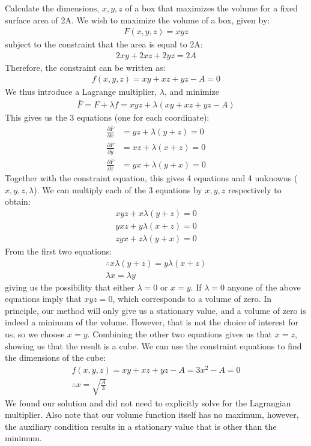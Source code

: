 \begin{example}{0pt}{Calculate the dimensions, $x,y,z$ of a box that maximizes the volume for a fixed surface area of 2A.}{}
We wish to maximize the volume of a box, given by:
\begin{align*}
F(x,y,z)=xyz
\end{align*}
subject to the constraint that the area is equal to 2A:
\begin{align*}
2xy+2xz+2yz=2A
\end{align*}
Therefore, the constraint can be written as:
\begin{align*}
f(x,y,z)=xy+xz+yz-A=0
\end{align*}
We thus introduce a Lagrange multiplier, $\lambda$, and minimize
\begin{align*}
\bar{F}=F+\lambda f= xyz+\lambda(xy+xz+yz-A)
\end{align*}
This gives us the 3 equations (one for each coordinate):
\begin{align*}
\frac{\partial \bar{F}}{\partial x}&=yz+\lambda(y+z)=0\\
\frac{\partial \bar{F}}{\partial y}&=xz+\lambda(x+z)=0\\
\frac{\partial \bar{F}}{\partial z}&=yx+\lambda(y+x)=0
\end{align*}
Together with the constraint equation, this gives 4 equations and 4 unknowns ($x,y,z,\lambda$). We can multiply each of the 3 equations by $x,y,z$ respectively to obtain:
\begin{align*}
xyz+x\lambda(y+z)=0\\
yxz+y\lambda(x+z)=0\\
zyx+z\lambda(y+x)=0
\end{align*}
From the first two equations:
\begin{align*}
\therefore x\lambda(y+z)=y\lambda(x+z)\\
\lambda x= \lambda y
\end{align*}
giving us the possibility that either $\lambda=0$ or $x=y$. If $\lambda=0$ anyone of the above equations imply that $xyz=0$, which corresponds to a volume of zero. In principle, our method will only give us a stationary value, and a volume of zero is indeed a minimum of the volume. However, that is not the choice of interest for us, so we choose $x=y$. Combining the other two equations gives us that $x=z$, showing us that the result is a cube. We can use the constraint equations to find the dimensions of the cube:
\begin{align*}
f(x,y,z)=xy+xz+yz-A=3x^2-A=0\nonumber\\
\therefore x=\sqrt{\frac{A}{3}}
\end{align*}
We found our solution and did not need to explicitly solve for the Lagrangian multiplier. Also note that our volume function itself has no maximum, however, the auxiliary condition results in a stationary value that is other than the minimum.
\label{ex:boxvolume}
\end{example}


